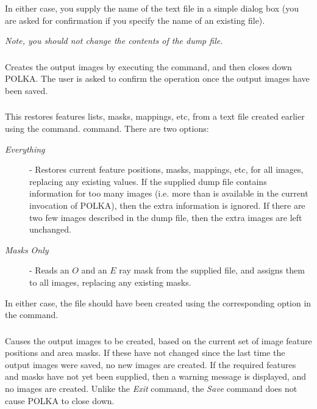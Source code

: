 In either case, you supply the name of the text file in a simple dialog
box (you are asked for confirmation if you specify the name of an
existing file).

{\em {\center Note, you should not change the contents of the dump file.}}

\subsubsection {} Creates the output images by executing
the  command, and then closes down
POLKA. The user is asked to confirm the operation once the output images
have been saved.

\subsubsection {} 
This restores features lists, masks, mappings, etc, from a text file
created earlier using the  command.
 command. There are two
options:

\begin{description}

\item [{\em Everything}] - Restores current feature positions, masks,
mappings, etc, for all images, replacing any existing values. If the
supplied dump file contains information for too many images (i.e. more
than is available in the current invocation of POLKA), then the extra
information is ignored. If there are two few images described in the dump
file, then the extra images are left unchanged.

\item [{\em Masks Only}] - Reads an $O$ and an $E$ ray mask from the supplied
file, and assigns them to all images, replacing any existing masks.

\end{description}

In either case, the file should have been created using the
corresponding option in the  command. 

\subsubsection {} Causes the output images to be
created, based on the current set of image feature positions and area masks. If
these have not changed since the last time the output images were saved,
no new images are created. If the required features and masks have not
yet been supplied, then a warning message is displayed, and no images are
created. Unlike the {\em Exit} command, the {\em Save} command does not
cause POLKA to close down.

